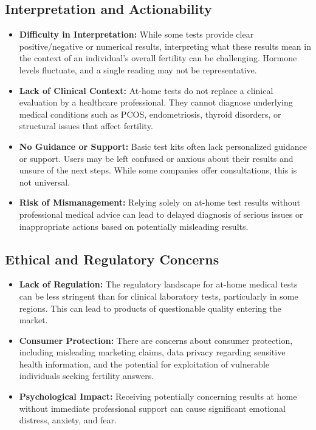 \documentclass{article}
\begin{document}
\subsection{Interpretation and Actionability}
\begin{itemize}
    \item \textbf{Difficulty in Interpretation:} While some tests provide clear positive/negative or numerical results, interpreting what these results mean in the context of an individual's overall fertility can be challenging. Hormone levels fluctuate, and a single reading may not be representative.
    \item \textbf{Lack of Clinical Context:} At-home tests do not replace a clinical evaluation by a healthcare professional. They cannot diagnose underlying medical conditions such as PCOS, endometriosis, thyroid disorders, or structural issues that affect fertility.
    \item \textbf{No Guidance or Support:} Basic test kits often lack personalized guidance or support. Users may be left confused or anxious about their results and unsure of the next steps. While some companies offer consultations, this is not universal.
    \item \textbf{Risk of Mismanagement:} Relying solely on at-home test results without professional medical advice can lead to delayed diagnosis of serious issues or inappropriate actions based on potentially misleading results.
\end{itemize}

\subsection{Ethical and Regulatory Concerns}
\begin{itemize}
    \item \textbf{Lack of Regulation:} The regulatory landscape for at-home medical tests can be less stringent than for clinical laboratory tests, particularly in some regions. This can lead to products of questionable quality entering the market.
    \item \textbf{Consumer Protection:} There are concerns about consumer protection, including misleading marketing claims, data privacy regarding sensitive health information, and the potential for exploitation of vulnerable individuals seeking fertility answers.
    \item \textbf{Psychological Impact:} Receiving potentially concerning results at home without immediate professional support can cause significant emotional distress, anxiety, and fear.
\end{itemize}
\end{document}
